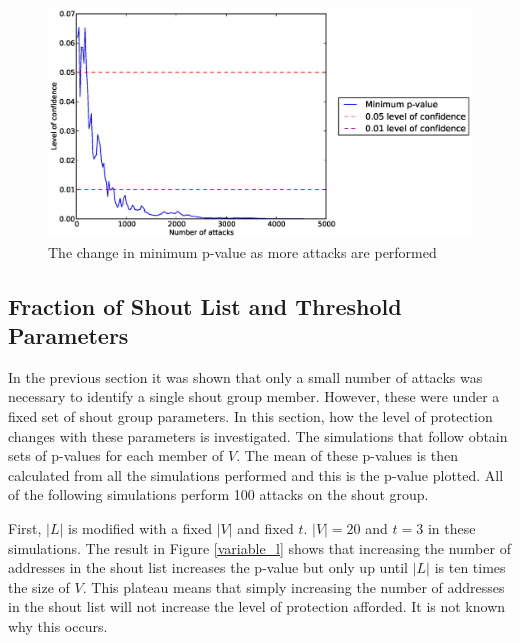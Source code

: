 \documentclass[ %
                    author={Luke Murray},
                supervisor={Dr. Simon Hollis},
                     title={Shadow Peer-to-Peer Networks},
                  subtitle={},
                    degree={MEng},
                      year={2013} ]{thesis}
\begin{document}
\begin{figure}[h]
    \centering
    \begin{minipage}[b]{0.8\linewidth}
        \centering
        \includegraphics[width=\linewidth]{diagrams/confidence_min.eps}
        \caption{The change in minimum p-value as more attacks are performed}
    \end{minipage}
    \label{confidence_min}
\end{figure}

\subsection{Fraction of Shout List and Threshold Parameters}

In the previous section it was shown that only a small number of attacks was necessary to identify a single shout group member. However, these were under a fixed set of shout group parameters. In this section, how the level of protection changes with these parameters is investigated. The simulations that follow obtain sets of p-values for each member of $V$. The mean of these p-values is then calculated from all the simulations performed and this is the p-value plotted. All of the following simulations perform 100 attacks on the shout group.

First, $|L|$ is modified with a fixed $|V|$ and fixed $t$. $|V| = 20$ and $t = 3$ in these simulations. The result in Figure \ref{variable_l} shows that increasing the number of addresses in the shout list increases the p-value but only up until $|L|$ is ten times the size of $V$. This plateau means that simply increasing the number of addresses in the shout list will not increase the level of protection afforded. It is not known why this occurs.
\end{document}
